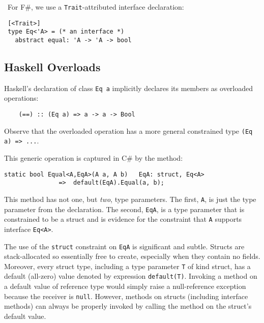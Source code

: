 \documentclass{elsarticle}
\newif\ifclassic
\begin{document}
\ifclassic
For new F\# syntax we adopt the keyword \lstinline{concept} (\lstinline{class} is already taken):

\lstset{language={FSharp}}
\begin{lstlisting}
concept Eq 'a where 
    (==): 'a -> 'a -> bool
\end{lstlisting}
\else
\noindent\ For F\#, we use a  \lstinline{Trait}-attributed interface declaration:
\begin{lstlisting}
 [<Trait>] 
 type Eq<'A> = (* an interface *)
   abstract equal: 'A -> 'A -> bool
\end{lstlisting}
\fi
 
\subsection{Haskell Overloads}
 Haskell's declaration of class \lstinline{Eq a} implicitly declares its members as overloaded 
operations:

\begin{lstlisting}
    (==) :: (Eq a) => a -> a -> Bool 
\end{lstlisting}
Observe that the overloaded operation has a more general constrained type \lstinline{(Eq a) => ...}.

This generic operation is captured in C\# by the method:
\begin{lstlisting}
static bool Equal<A,EqA>(A a, A b)   EqA: struct, Eq<A>
               =>  default(EqA).Equal(a, b);
\end{lstlisting}
This method has not one, but \emph{two}, type parameters. The first, \lstinline{A}, is just the type parameter from the declaration.
The second, \lstinline{EqA}, is a type parameter that is constrained to be a struct and is evidence for the constraint that \lstinline{A} supports interface \lstinline{Eq<A>}.

The use of the \lstinline{struct} constraint on \lstinline{EqA} is significant and subtle. Structs are stack-allocated so essentially free to create, especially when they contain no fields.
Moreover, every struct type, including a type parameter \lstinline{T} of kind struct, has a default (all-zero) value denoted by
 expression \lstinline{default(T)}.
Invoking a method on a default value of reference type would simply raise a null-reference exception because the receiver is \lstinline{null}.
However, methods on structs (including interface methods) can always be properly invoked
by calling the method on the struct's default value. 
\end{document}

